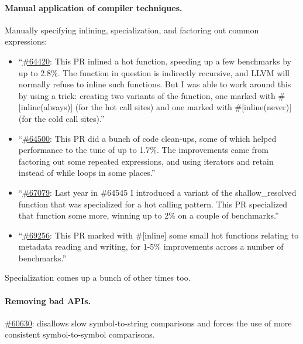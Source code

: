 \paragraph{Manual application of compiler techniques.} Manually specifying inlining, specialization, and factoring out common expressions:
\begin{itemize}[noitemsep]
\item ``\href{https://github.com/rust-lang/rust/pull/64420}{\#64420}: This PR inlined a hot function, speeding up a few benchmarks by up to 2.8\%. The function in question is indirectly recursive, and LLVM will normally refuse to inline such functions. But I was able to work around this by using a trick: creating two variants of the function, one marked with \#[inline(always)] (for the hot call sites) and one marked with \#[inline(never)] (for the cold call sites).''
\item ``\href{https://github.com/rust-lang/rust/pull/64500}{\#64500}: This PR did a bunch of code clean-ups, some of which helped performance to the tune of up to 1.7\%. The improvements came from factoring out some repeated expressions, and using iterators and retain instead of while loops in some places.''
\item ``\href{https://github.com/rust-lang/rust/pull/67079}{\#67079}: Last year in \#64545 I introduced a variant of the shallow\_resolved function that was specialized for a hot calling pattern. This PR specialized that function some more, winning up to 2\% on a couple of benchmarks.''
\item ``\href{https://github.com/rust-lang/rust/pull/69256}{\#69256}: This PR marked with \#[inline] some small hot functions relating to metadata reading and writing, for 1-5\% improvements across a number of benchmarks.''
\end{itemize}
Specialization comes up a bunch of other times too.

\paragraph{Removing bad APIs.} \href{https://github.com/rust-lang/rust/pull/60630}{\#60630}: disallows slow symbol-to-string comparisons and forces the use of more consistent symbol-to-symbol comparisons.

